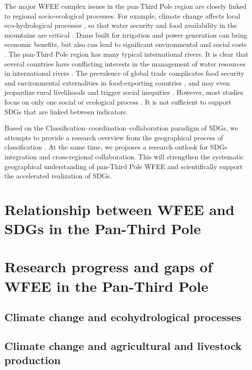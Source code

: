 \documentclass[Afour,sageh,times]{sagej}
\begin{document}
The major WFEE complex issues in the pan-Third Pole region are closely linked to regional socio-ecological processes. For example, climate change affects local eco-hydrological processes \citep{pritchardAsiaShrinkingGlaciers2019b}, so that water security and food availability in the mountains are critical \citep{viviroliIncreasingDependenceLowland2020}. Dams built for irrigation and power generation can bring economic benefits, but also can lead to significant environmental and social costs \citep{zivTradingoffFishBiodiversity2012, zengHydropowerIrrigationAnalysis2017}. The pan-Third Pole region has many typical international rivers. It is clear that several countries have conflicting interests in the management of water resources in international rivers \citep{dodoricoGlobalFoodEnergyWaterNexus2018}. The prevalence of global trade complicates food security and environmental externalities in food-exporting countries \citep{graftonPossiblePathwaysTensions2017}, and may even jeopardize rural livelihoods and trigger social inequities \citep{dellangeloThreatsSustainableDevelopment2017}. However, most studies focus on only one social or ecological process . It is not sufficient to support SDGs that are linked between indicators.

Based on the Classification–coordination–collaboration paradigm of SDGs, we attempts to provide a research overview from the geographical process of classification \citep{fuClassificationCoordinationCollaboration2020}. At the same time,  we proposes a research outlook for SDGs integration and cross-regional collaboration. This will strengthen the systematic geographical understanding of pan-Third Pole WFEE and scientifically support the accelerated realization of SDGs.

\section{Relationship between WFEE and SDGs in the Pan-Third Pole}

\section{Research progress and gaps of WFEE in the Pan-Third Pole}

\subsection{Climate change and ecohydrological processes} 

\subsection{Climate change and agricultural and livestock production}
\end{document}

